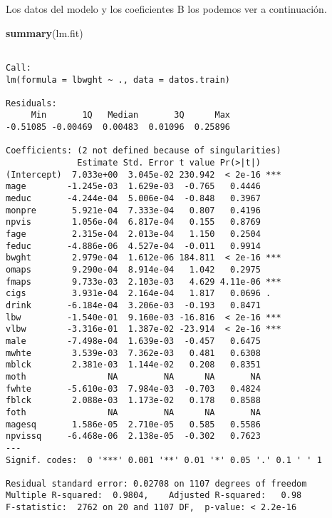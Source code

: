\documentclass[]{article}
\newenvironment{Shaded}{\begin{snugshade}}{\end{snugshade}}
\newcommand{\KeywordTok}[1]{\textcolor[rgb]{0.13,0.29,0.53}{\textbf{#1}}}
\newcommand{\OperatorTok}[1]{\textcolor[rgb]{0.81,0.36,0.00}{\textbf{#1}}}
\newcommand{\NormalTok}[1]{#1}
\begin{document}
Los datos del modelo y los coeficientes B los podemos ver a
continuación.

\begin{Shaded}
\begin{Highlighting}[]
\KeywordTok{summary}\NormalTok{(lm.fit)}
\end{Highlighting}
\end{Shaded}

\begin{verbatim}

Call:
lm(formula = lbwght ~ ., data = datos.train)

Residuals:
     Min       1Q   Median       3Q      Max 
-0.51085 -0.00469  0.00483  0.01096  0.25896 

Coefficients: (2 not defined because of singularities)
              Estimate Std. Error t value Pr(>|t|)    
(Intercept)  7.033e+00  3.045e-02 230.942  < 2e-16 ***
mage        -1.245e-03  1.629e-03  -0.765   0.4446    
meduc       -4.244e-04  5.006e-04  -0.848   0.3967    
monpre       5.921e-04  7.333e-04   0.807   0.4196    
npvis        1.056e-04  6.817e-04   0.155   0.8769    
fage         2.315e-04  2.013e-04   1.150   0.2504    
feduc       -4.886e-06  4.527e-04  -0.011   0.9914    
bwght        2.979e-04  1.612e-06 184.811  < 2e-16 ***
omaps        9.290e-04  8.914e-04   1.042   0.2975    
fmaps        9.733e-03  2.103e-03   4.629 4.11e-06 ***
cigs         3.931e-04  2.164e-04   1.817   0.0696 .  
drink       -6.184e-04  3.206e-03  -0.193   0.8471    
lbw         -1.540e-01  9.160e-03 -16.816  < 2e-16 ***
vlbw        -3.316e-01  1.387e-02 -23.914  < 2e-16 ***
male        -7.498e-04  1.639e-03  -0.457   0.6475    
mwhte        3.539e-03  7.362e-03   0.481   0.6308    
mblck        2.381e-03  1.144e-02   0.208   0.8351    
moth                NA         NA      NA       NA    
fwhte       -5.610e-03  7.984e-03  -0.703   0.4824    
fblck        2.088e-03  1.173e-02   0.178   0.8588    
foth                NA         NA      NA       NA    
magesq       1.586e-05  2.710e-05   0.585   0.5586    
npvissq     -6.468e-06  2.138e-05  -0.302   0.7623    
---
Signif. codes:  0 '***' 0.001 '**' 0.01 '*' 0.05 '.' 0.1 ' ' 1

Residual standard error: 0.02708 on 1107 degrees of freedom
Multiple R-squared:  0.9804,    Adjusted R-squared:   0.98 
F-statistic:  2762 on 20 and 1107 DF,  p-value: < 2.2e-16
\end{verbatim}

\begin{Shaded}
\end{Shaded}
\end{document}
